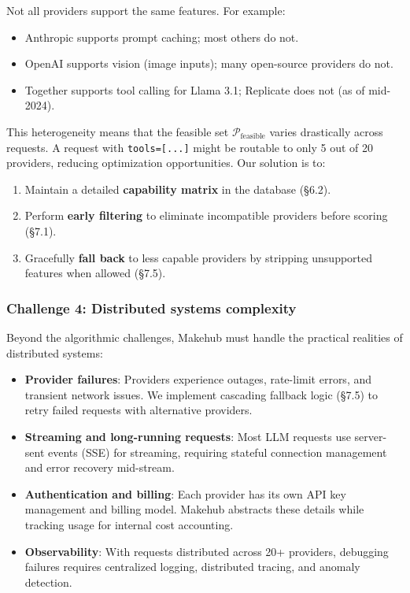 \documentclass[english]{article}
\begin{document}
Not all providers support the same features. For example:
\begin{itemize}
    \item Anthropic supports prompt caching; most others do not.
    \item OpenAI supports vision (image inputs); many open-source providers do not.
    \item Together supports tool calling for Llama 3.1; Replicate does not (as of mid-2024).
\end{itemize}

This heterogeneity means that the feasible set $\mathcal{P}_{\text{feasible}}$ varies drastically across requests. A request with \texttt{tools=[...]} might be routable to only 5 out of 20 providers, reducing optimization opportunities. Our solution is to:
\begin{enumerate}
    \item Maintain a detailed \textbf{capability matrix} in the database (§6.2).
    \item Perform \textbf{early filtering} to eliminate incompatible providers before scoring (§7.1).
    \item Gracefully \textbf{fall back} to less capable providers by stripping unsupported features when allowed (§7.5).
\end{enumerate}

\subsubsection{Challenge 4: Distributed systems complexity}

Beyond the algorithmic challenges, Makehub must handle the practical realities of distributed systems:
\begin{itemize}
    \item \textbf{Provider failures}: Providers experience outages, rate-limit errors, and transient network issues. We implement cascading fallback logic (§7.5) to retry failed requests with alternative providers.
    \item \textbf{Streaming and long-running requests}: Most LLM requests use server-sent events (SSE) for streaming, requiring stateful connection management and error recovery mid-stream.
    \item \textbf{Authentication and billing}: Each provider has its own API key management and billing model. Makehub abstracts these details while tracking usage for internal cost accounting.
    \item \textbf{Observability}: With requests distributed across 20+ providers, debugging failures requires centralized logging, distributed tracing, and anomaly detection.
\end{itemize}
\end{document}

